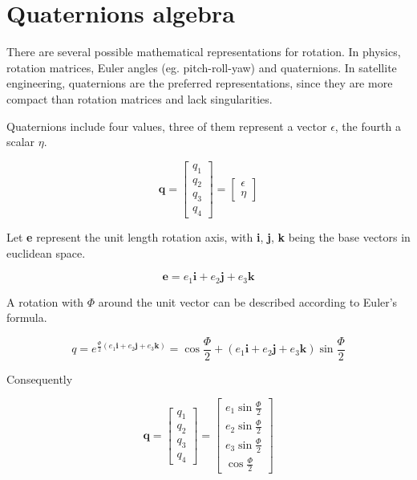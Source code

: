 \chapter{Quaternions algebra} \label{chap:B}


There are several possible mathematical representations for rotation. In physics, rotation matrices, Euler angles (eg. pitch-roll-yaw) and quaternions. In satellite engineering, quaternions are the preferred representations, since they are more compact than rotation matrices and lack singularities.

Quaternions include four values, three of them represent a vector \textbf{$\epsilon$}, the fourth a scalar $\eta$. 

\begin{equation}
\textbf{q} =
\left[ 
\begin{array}{cccc}
q_1 \\
q_2 \\  
q_3 \\
q_4 
\end{array}
\right] 
= 
\left[ 
\begin{array}{cccc}
\textbf{$\epsilon$} \\
\eta
\end{array}
\right] 
\end{equation}

Let \textbf{e} represent the unit length rotation axis, with \textbf{i}, \textbf{j}, \textbf{k} being the base vectors in euclidean space. 

\begin{equation}
\textbf{e} = e_1 \textbf{i}+ e_2 \textbf{j} + e_3 \textbf{k}
\end{equation}

A rotation with $\Phi$ around the unit vector can be described according to Euler's formula.

\begin{equation}
q = e^{\frac{\Phi}{2} (e_1 \textbf{i}+ e_2 \textbf{j} + e_3 \textbf{k})} = \cos \frac{\Phi}{2} + (e_1 \textbf{i}+ e_2 \textbf{j} + e_3 \textbf{k}) \sin \frac{\Phi}{2}
\end{equation}

Consequently 

\begin{equation}
\textbf{q} =
\left[ 
\begin{array}{cccc}
q_1 \\
q_2 \\  
q_3 \\
q_4 
\end{array}
\right] 
= 
\left[ 
\begin{array}{cccc}
e_1  \sin \frac{\Phi}{2} \\
e_2  \sin \frac{\Phi}{2} \\  
e_3  \sin \frac{\Phi}{2} \\
\cos \frac{\Phi}{2} 
\end{array}
\right] 
\end{equation}
